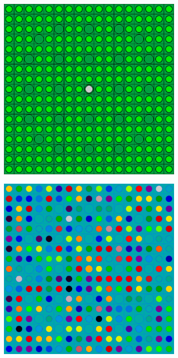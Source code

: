 \begin{figure}[h!]
\centering
\begin{subfigure}{.5\textwidth}
  \centering
  \includegraphics[width=0.9\linewidth]{figures/quantification/homogenization/assm-16-null-materials}
  \caption{}
  \label{fig:chap8-assm-16-null-materials}
\end{subfigure}%
\begin{subfigure}{.5\textwidth}
  \centering
  \includegraphics[width=0.9\linewidth]{figures/quantification/homogenization/assm-16-degenerate-materials}

\end{subfigure}
\end{figure}
